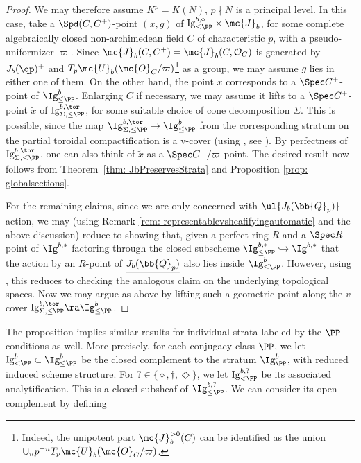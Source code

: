 \documentclass[letterpaper,11pt]{amsart}
\begin{document}
\begin{proof}
    We may therefore assume $K^p=K(N)$, $p\nmid N$ is a principal level. In this case, take a $\Spd (C,C^{+})$-point $(x,g)$ of $\mathrm{Ig}^{b,\diamond}_{\leq\PP}\times \mc{J}_b$, for some complete algebraically closed non-archimedean field $C$ of characteristic $p$, with a pseudo-uniformizer $\varpi$. Since $\mc{J}_b(C,C^{+}) = \mc{J}_{b}(C,\mathcal{O}_{C})$ is generated by $J_b(\qp)^+$ and $T_p\mc{U}_b(\mc{O}_C/\varpi)$\footnote{Indeed, the unipotent part $\mc{J}^{>0}_b(C)$ can be identified as the union $\cup_{n} p^{-n}T_p\mc{U}_b(\mc{O}_C/\varpi)$.} as a group, we may assume $g$ lies in either one of them. On the other hand, the point $x$ corresponds to a $\Spec C^{+}$-point of $\Ig^b_{\leq \PP}$. Enlarging $C$ if necessary, we may assume it lifts to a  $\Spec C^{+}$-point $\tilde{x}$ of $\mathrm{Ig}^{b,\tor}_{\Sigma,\leq\PP}$, for some suitable choice of cone decomposition $\Sigma$. This is possible, since the map $\Ig^{b,\tor}_{\Sigma,\leq \PP}\to \Ig^b_{\leq \PP}$ from the corresponding stratum on the partial toroidal compactification is a v-cover (using \cite[Proposition~3.3.4]{CS2}, see \cite[Definition 2.1, Example 2.3(ii)]{BSWitt}). By perfectness of $\mathrm{Ig}^{b,\tor}_{\Sigma,\leq\PP}$, one can also think of $\tilde{x}$ as a $\Spec C^{+}/\varpi$-point. The desired result now follows from Theorem~\ref{thm: JbPreservesStrata} and Proposition \ref{prop: globalsections}.

    For the remaining claims, since we are only concerned with $\ul{J_{b}(\bb{Q}_{p})}$-action, we may (using Remark \ref{rem: representablevsheafifyingautomatic} and the above discussion) reduce to showing that, given a perfect ring $R$ and a $\Spec R$-point of $\Ig^{b,*}$ factoring through the closed subscheme $\Ig^{b,*}_{\leq \PP} \hookrightarrow \Ig^{b,*}$ that the action by an $R$-point of $\underline{J_{b}(\bb{Q}_{p})}$ also lies inside $\Ig^{b}_{\leq \PP}$. However, using \cite[Lemma~3.10]{HamannLeeTorsion}, this reduces to checking the analogous claim on the underlying topological spaces. Now we may argue as above by lifting such a geometric point along the $v$-cover $\mathrm{Ig}^{b,\tor}_{\Sigma,\leq\PP} \ra \Ig^{b}_{\leq \PP}$.
\end{proof}
The proposition implies similar results for individual strata labeled by the $\PP$ conditions as well. More precisely, for each conjugacy class $\PP$, we let $\mathrm{Ig}_{<\PP}^b\subset \Ig_{\leq \PP}^b$ be the closed complement to the stratum $\Ig^b_\PP$, with reduced induced scheme structure. For $? \in \{\diamond,\dagger,\Diamond\}$, we let $\mathrm{Ig}_{<\PP}^{b,?}$ be its associated analytification. This is a closed subsheaf of $\Ig_{\leq \PP}^{b,?}$. We can consider its open complement by defining
\end{document}
